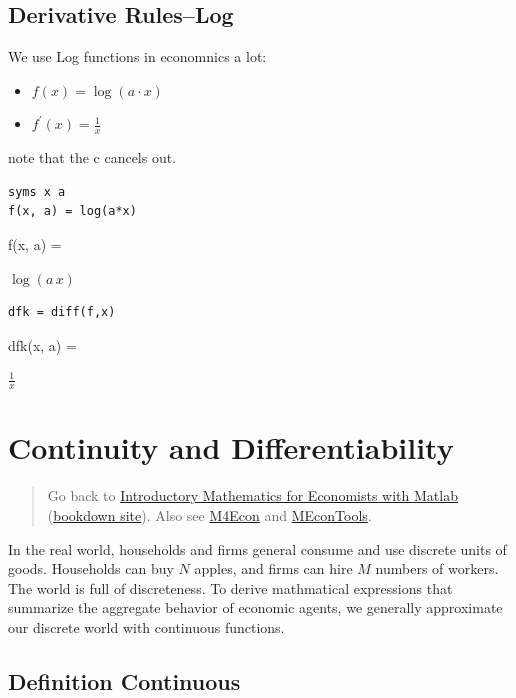 \documentclass[
]{book}
\begin{document}
\hypertarget{derivative-ruleslog}{%
\subsection{Derivative Rules--Log}\label{derivative-ruleslog}}

We use Log functions in economnics a lot:

\begin{itemize}
\item
  \(\displaystyle f(x)=\log (a\cdot x)\)
\item
  \(\displaystyle f^{\prime } (x)=\frac{1}{x}\)
\end{itemize}

note that the c cancels out.

\begin{verbatim}
syms x a
f(x, a) = log(a*x)
\end{verbatim}

f(x, a) =

\(\displaystyle \log \left(a\,x\right)\)

\begin{verbatim}
dfk = diff(f,x)
\end{verbatim}

dfk(x, a) =

\(\displaystyle \frac{1}{x}\)

\hypertarget{continuity-and-differentiability}{%
\section{Continuity and Differentiability}\label{continuity-and-differentiability}}

\begin{quote}
Go back to \href{https://math4econ.github.io/}{Introductory Mathematics for Economists with Matlab} (\href{https://math4econ.github.io/bookdown}{bookdown site}). Also see \href{http://fanwangecon.github.io/M4Econ}{M4Econ} and \href{https://fanwangecon.github.io/MEconTools/}{MEconTools}.
\end{quote}

In the real world, households and firms general consume and use discrete
units of goods. Households can buy \(N\) apples, and firms can hire \(M\)
numbers of workers. The world is full of discreteness. To derive
mathmatical expressions that summarize the aggregate behavior of
economic agents, we generally approximate our discrete world with
continuous functions.

\hypertarget{definition-continuous}{%
\subsection{Definition Continuous}\label{definition-continuous}}
\end{document}
